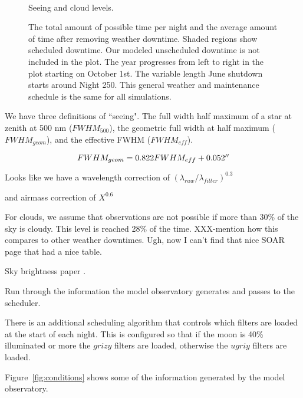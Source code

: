 \documentclass[]{aastex631}
\begin{document}
\begin{figure}
    \centering
     \\
    \caption{Seeing and cloud levels.}
    \label{fig:seeing_clouds}
\end{figure}


\begin{figure}
    \centering
    \caption{The total amount of possible time per night and the average amount of time
after removing weather downtime. Shaded regions show scheduled downtime. Our modeled
unscheduled downtime is not included in the plot. The year progresses from left to right in
the plot starting on October 1st. The variable length June shutdown starts around Night
250. This general weather and maintenance schedule is the same for all simulations.}
    \label{fig:downtime}
\end{figure}

We have three definitions of ``seeing". The full width half maximum of a star at zenith at 500 nm ($FWHM_{500}$), the geometric full width at half maximum ($FWHM_{geom}$), and the effective FWHM ($FWHM_{eff}$).

\begin{equation}
    FWHM_{geom} = 0.822 FWHM_{eff} + 0.052\arcsec
\end{equation}

Looks like we have a wavelength correction of $(\lambda_{raw}/\lambda_{filter})^{0.3}$

and airmass correction of $X^{0.6}$

For clouds, we assume that observations are not possible if more than 30\% of the sky is cloudy. This level is reached 28\% of the time. XXX-mention how this compares to other weather downtimes. Ugh, now I can't find that nice SOAR page that had a nice table.

Sky brightness paper \citep{Yoachim2016}. 


Run through the information the model observatory generates and passes to the scheduler.

There is an additional scheduling algorithm that controls which filters are loaded at the start of each night. This is configured so that if the moon is 40\% illuminated or more the $grizy$ filters are loaded, otherwise the $ugriy$ filters are loaded.

Figure~\ref{fig:conditions} shows some of the information generated by the model observatory. 
\end{document}
